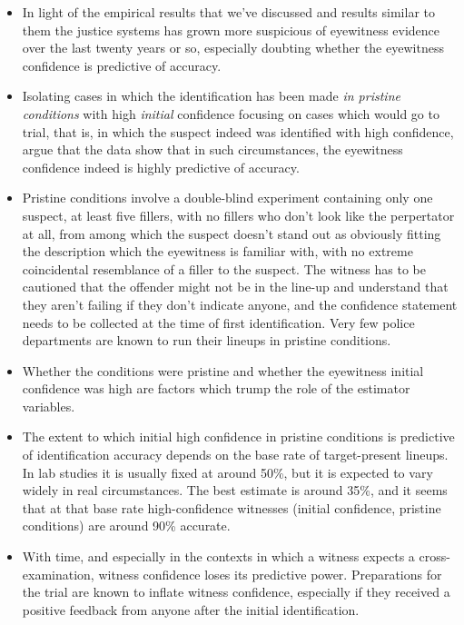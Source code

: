 \documentclass{article}
\begin{document}
\begin{itemize}
\item In light of the empirical results that we've discussed and results similar to them the justice systems has grown more suspicious of eyewitness evidence over the last twenty years or so, especially doubting whether the eyewitness confidence is predictive of  accuracy.
\item Isolating cases in which the identification has been made \emph{in pristine conditions} with  high \emph{initial} confidence focusing on cases which would go to trial, that is, in which the suspect indeed was identified with high confidence, \citet{wixted2017RelationshipEyewitnessConfidence}  argue that the data show that in such circumstances, the eyewitness confidence indeed is highly predictive of accuracy.
\item Pristine conditions involve a double-blind experiment containing only one suspect, at least five fillers, with no fillers who don't look like the perpertator at all, from among which the suspect doesn't stand out as obviously fitting the description which the eyewitness is familiar with, with no extreme coincidental resemblance of a filler to the suspect. The witness has to be cautioned that the offender might not be in the line-up and understand that they aren't failing if they don't indicate anyone, and the confidence statement needs to be collected at the time of first identification.  Very few police departments are known to run their lineups in pristine conditions.
\item Whether the conditions were pristine and whether the eyewitness initial confidence was high 
are factors which trump the role of the estimator variables.
\item The extent to which initial  high  confidence in pristine conditions is predictive of identification accuracy depends on the base rate of target-present lineups. In lab studies it is usually fixed at around 50\%, but it is expected to vary widely in real circumstances. The best estimate is around 35\%, and it seems that at that base rate high-confidence witnesses (initial confidence, pristine conditions) are around 90\% accurate. 
\item With time, and especially in the contexts in which a witness expects a cross-examination, witness confidence loses its predictive power.  Preparations for the trial are known to inflate witness confidence, especially if they received a positive feedback from anyone after the initial identification.
\end{itemize}
\end{document}
